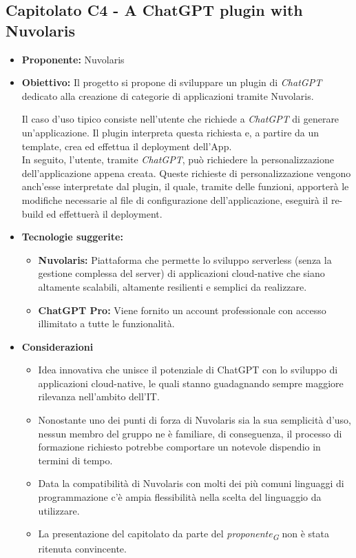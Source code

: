 \documentclass{article}
\begin{document}
\subsection{\textbf{Capitolato C4} - A ChatGPT plugin with Nuvolaris}
\begin{itemize}
    \item[] \textbf{Proponente:} Nuvolaris
    
    \item[] \textbf{Obiettivo:} Il progetto si propone di sviluppare un plugin di \textit{ChatGPT} dedicato alla creazione di categorie di applicazioni tramite Nuvolaris.
    
    Il caso d'uso tipico consiste nell'utente che richiede a \textit{ChatGPT} di generare un'applicazione. Il plugin interpreta questa richiesta e, a partire da un template, crea ed effettua il deployment dell'App. \\
    In seguito, l'utente, tramite \textit{ChatGPT}, può richiedere la personalizzazione dell'applicazione appena creata. Queste richieste di personalizzazione vengono anch'esse interpretate dal plugin, il quale, tramite delle funzioni, apporterà le modifiche necessarie al file di configurazione dell'applicazione, eseguirà il re-build ed effettuerà il deployment.
    
    \item[] \textbf{Tecnologie suggerite:}
    \begin{itemize}
        \item \textbf{Nuvolaris:} Piattaforma che permette lo sviluppo serverless (senza la gestione complessa del server) di applicazioni cloud-native che siano altamente scalabili, altamente resilienti e semplici da realizzare. 
        \item \textbf{ChatGPT Pro:} Viene fornito un account professionale con accesso illimitato a tutte le funzionalità.
    \end{itemize}
    
    \item[] \textbf{Considerazioni}
    \begin{itemize}
        \item Idea innovativa che unisce il potenziale di ChatGPT con lo sviluppo di applicazioni cloud-native, le quali stanno guadagnando sempre maggiore rilevanza nell'ambito dell'IT.
        \item Nonostante uno dei punti di forza di Nuvolaris sia la sua semplicità d'uso, nessun membro del gruppo ne è familiare, di conseguenza, il processo di formazione richiesto potrebbe comportare un notevole dispendio in termini di tempo.
        \item Data la compatibilità di Nuvolaris con molti dei più comuni linguaggi di programmazione c’è ampia flessibilità nella scelta del linguaggio da utilizzare.
        \item La presentazione del capitolato da parte del \textit{proponente}\textsubscript{\textit{G}} non è stata ritenuta convincente.
    \end{itemize} 
    
\end{itemize}
\pagebreak
\end{document}
